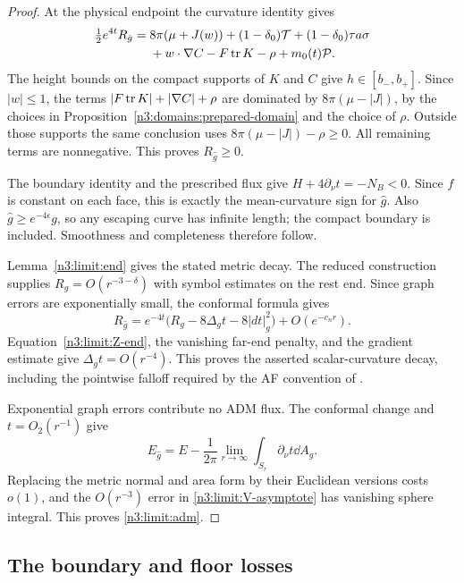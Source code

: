 \begin{proof}
At the physical endpoint the curvature identity gives
\begin{align*}
 \tfrac12e^{4t}R_{\hat g}
 ={}&8\pi(\mu+J(w))+(1-\delta_0)\mathcal T
       +(1-\delta_0)\tau a\sigma\\
    &+w\cdot\nabla C-F\operatorname{tr} K-\rho+m_0(t)\mathcal P.
\end{align*}
The height bounds on the compact supports of \(K\) and \(C\) give
\(h\in[b_-,b_+]\). Since \(|w|\le1\), the terms
\(|F\operatorname{tr} K|+|\nabla C|+\rho\) are dominated by
\(8\pi(\mu-|J|)\), by the choices in
Proposition~\ref{n3:domains:prepared-domain} and the choice of \(\rho\).
Outside those supports the same conclusion uses
\(8\pi(\mu-|J|)-\rho\ge0\).
All remaining terms are nonnegative. This proves
\(R_{\hat g}\ge0\).

The boundary identity and the prescribed flux give
\(H+4\partial_\nu t=-N_B<0\). Since \(f\) is constant on each face,
this is exactly the mean-curvature sign for \(\hat g\).
Also \(\hat g\ge e^{-4\epsilon}g\), so any escaping curve has infinite
length; the compact boundary is included. Smoothness and completeness
therefore follow.

Lemma~\ref{n3:limit:end} gives the stated metric decay. The reduced
construction supplies \(R_g=O(r^{-3-\delta})\) with symbol estimates
on the rest end. Since graph errors are exponentially small, the
conformal formula gives
\[
 R_{\hat g}
 =e^{-4t}\bigl(R_g-8\Delta_gt-8|dt|_g^2\bigr)
      +O(e^{-c_n r}).
\]
Equation~\eqref{n3:limit:Z-end}, the vanishing far-end penalty, and the
gradient estimate give \(\Delta_gt=O(r^{-4})\).
This proves the asserted scalar-curvature decay, including the
pointwise falloff required by the AF convention of
\cite[Definition~21 and Theorem~19]{Bray2001}.

Exponential graph errors contribute no ADM flux. The conformal change
and \(t=O_2(r^{-1})\) give
\[
 E_{\hat g}
 =E-\frac1{2\pi}\lim_{r\to\infty}
                 \int_{S_r}\partial_\nu t\dd A_g.
\]
Replacing the metric normal and area form by their Euclidean versions
costs \(o(1)\), and the \(O(r^{-3})\) error in
\eqref{n3:limit:V-asymptote} has vanishing sphere integral.
This proves \eqref{n3:limit:adm}.
\end{proof}

\subsection{The boundary and floor losses}

